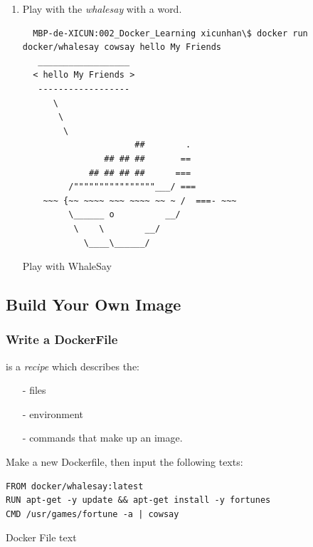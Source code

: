 \documentclass[12pt,a4paper]{article}
\begin{document}
\begin{enumerate}
  \item Play with the \emph{whalesay} with a word.

  \begin{listing}[ht]
   \begin{verbatim}
  MBP-de-XICUN:002_Docker_Learning xicunhan\$ docker run docker/whalesay cowsay hello My Friends
   __________________
  < hello My Friends >
   ------------------
      \
       \
        \
                      ##        .
                ## ## ##       ==
             ## ## ## ##      ===
         /""""""""""""""""___/ ===
    ~~~ {~~ ~~~~ ~~~ ~~~~ ~~ ~ /  ===- ~~~
         \______ o          __/
          \    \        __/
            \____\______/

  \end{verbatim}
  \label{code:5}
  \caption{Play with WhaleSay}
   \end{listing}
  \FloatBarrier

\end{enumerate}


\subsection{Build Your Own Image}

\subsubsection{Write a DockerFile}

\emph{{\color{orange}{Dockerfile}}} is a \textit{recipe} which describes the:
\begin{itemize}
  \item[-] files
  \item[-] environment
  \item[-] commands that make up an image.
\end{itemize}

Make a new Dockerfile, then input the following texts: \\

\begin{listing}[ht]
 \begin{verbatim}
FROM docker/whalesay:latest
RUN apt-get -y update && apt-get install -y fortunes
CMD /usr/games/fortune -a | cowsay
\end{verbatim}
\label{code:6}
\caption{Docker File text}
 \end{listing}
\FloatBarrier
\end{document}
